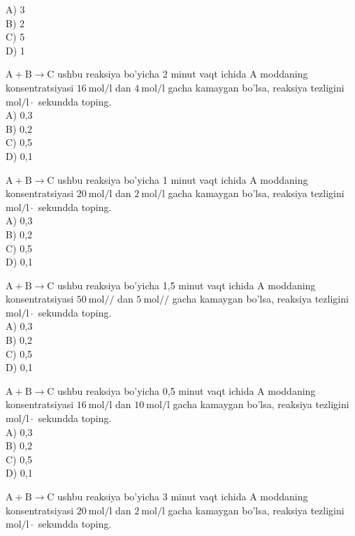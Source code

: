 A) 3\\
B) 2\\
C) 5\\
D) 1
  \item $\mathrm{A}+\mathrm{B} \rightarrow \mathrm{C}$ ushbu reaksiya bo'yicha 2 minut vaqt ichida A moddaning konsentratsiyasi $16 \mathrm{~mol} / \mathrm{l}$ dan $4 \mathrm{~mol} / \mathrm{l}$ gacha kamaygan bo'lsa, reaksiya tezligini $\mathrm{mol} / \mathrm{l} \cdot$ sekundda toping.\\
A) 0,3\\
B) 0,2\\
C) 0,5\\
D) 0,1\\
  \item $\mathrm{A}+\mathrm{B} \rightarrow \mathrm{C}$ ushbu reaksiya bo'yicha 1 minut vaqt ichida A moddaning konsentratsiyasi $20 \mathrm{~mol} / \mathrm{l}$ dan $2 \mathrm{~mol} / \mathrm{l}$ gacha kamaygan bo'lsa, reaksiya tezligini $\mathrm{mol} / \mathrm{l} \cdot$ sekundda toping.\\
A) 0,3\\
B) 0,2\\
C) 0,5\\
D) 0,1
  \item $\mathrm{A}+\mathrm{B} \rightarrow \mathrm{C}$ ushbu reaksiya bo'yicha 1,5 minut vaqt ichida A moddaning konsentratsiyasi $50 \mathrm{~mol} / /$ dan $5 \mathrm{~mol} / /$ gacha kamaygan bo'lsa, reaksiya tezligini $\mathrm{mol} / \mathrm{l} \cdot$ sekundda toping.\\
A) 0,3\\
B) 0,2\\
C) 0,5\\
D) 0,1
  \item $\mathrm{A}+\mathrm{B} \rightarrow \mathrm{C}$ ushbu reaksiya bo'yicha 0,5 minut vaqt ichida A moddaning konsentratsiyasi $16 \mathrm{~mol} / \mathrm{l}$ dan $10 \mathrm{~mol} / \mathrm{l}$ gacha kamaygan bo'lsa, reaksiya tezligini $\mathrm{mol} / \mathrm{l} \cdot$ sekundda toping.\\
A) 0,3\\
B) 0,2\\
C) 0,5\\
D) 0,1
  \item $\mathrm{A}+\mathrm{B} \rightarrow \mathrm{C}$ ushbu reaksiya bo'yicha 3 minut vaqt ichida A moddaning konsentratsiyasi $20 \mathrm{~mol} / \mathrm{l}$ dan $2 \mathrm{~mol} / \mathrm{l}$ gacha kamaygan bo'lsa, reaksiya tezligini $\mathrm{mol} / \mathrm{l} \cdot$ sekundda toping.\\
